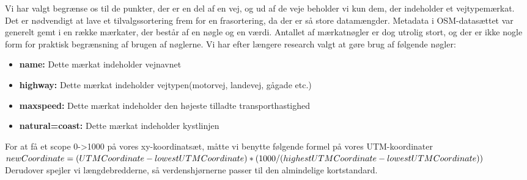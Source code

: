 Vi har valgt begrænse os til de punkter, der er en del af en vej, og ud af de veje beholder vi kun dem, der indeholder et vejtypemærkat. Det er nødvendigt at lave et tilvalgssortering frem for en frasortering, da der er så store datamængder. Metadata i OSM-datasættet var generelt gemt i en række mærkater, der består af en nøgle og en værdi. Antallet af mærkatnøgler er dog utrolig stort, og der er ikke nogle form for praktisk begrænsning af brugen af nøglerne. Vi har efter længere research valgt at gøre brug af følgende nøgler:

\begin{itemize}
	\item \textbf{name:} Dette mærkat indeholder vejnavnet
	\item \textbf{highway:} Dette mærkat indeholder vejtypen(motorvej, landevej, gågade etc.)
	\item \textbf{maxspeed:} Dette mærkat indeholder den højeste tilladte transporthastighed
	\item \textbf{natural=coast:} Dette mærkat indeholder kystlinjen
\end{itemize}

For at få et scope 0->1000 på vores xy-koordinatsæt, måtte vi benytte følgende formel på vores UTM-koordinater $newCoordinate = \\(UTMCoordinate-lowestUTMCoordinate) * (1000/(highestUTMCoordinate-lowestUTMCoordinate)) $\\ Derudover spejler vi længdebredderne, så verdenshjørnerne passer til den almindelige kortstandard.
